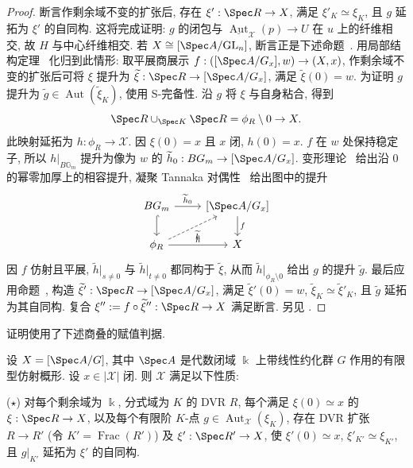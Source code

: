 \begin{proof}
断言作剩余域不变的扩张后, 存在 $\xi':\Spec R\to\mathcal X$, 满足 $\xi'_K\simeq\xi_K$, 且 $g$ 延拓为 $\xi'$ 的自同构. 这将完成证明: $g$ 的闭包与 $\underline{\operatorname{Aut}}_{\mathcal X}(p)\to U$ 在 $u$ 上的纤维相交, 故 $H$ 与中心纤维相交. 若 $\mathcal X\cong[\Spec A/\mathrm{GL}_n]$, 断言正是下述命题~. 用局部结构定理~ 化归到此情形: 取平展商展示 $f:([\Spec A/G_x],w)\to(\mathcal X,x)$, 作剩余域不变的扩张后可将 $\xi$ 提升为 $\widetilde\xi:\Spec R\to[\Spec A/G_x]$, 满足 $\widetilde\xi(0)=w$. 为证明 $g$ 提升为 $\widetilde g\in\operatorname{Aut}(\widetilde\xi_K)$, 使用 S-完备性. 沿 $g$ 将 $\xi$ 与自身粘合, 得到
\[\Spec R\cup_{\Spec K}\Spec R=\phi_R\setminus0\to\mathcal X.\]
此映射延拓为 $h:\phi_R\to\mathcal X$. 因 $\xi(0)=x$ 且 $x$ 闭, $h(0)=x$. $f$ 在 $w$ 处保持稳定子, 所以 $h|_{B\mathbb G_m}$ 提升为像为 $w$ 的 $\widetilde h_0:B\mathbb G_m\to[\Spec A/G_x]$. 变形理论~ 给出沿 $0$ 的幂零加厚上的相容提升, 凝聚 Tannaka 对偶性~ 给出图中的提升
\[\begin{tikzcd}[ampersand replacement=\&]B\mathbb G_m\arrow[r,"{\widetilde h_0}"]\arrow[d,hook]\&{[\Spec A/G_x]}\arrow[d,"{f}"]\\\phi_R\arrow[r,"{h}"]\arrow[ur,dashed,"{\widetilde h}"']\&\mathcal X\end{tikzcd}\]
因 $f$ 仿射且平展, $\widetilde h|_{s\ne0}$ 与 $\widetilde h|_{t\ne0}$ 都同构于 $\widetilde\xi$, 从而 $\widetilde h|_{\phi_R\setminus0}$ 给出 $g$ 的提升 $\widetilde g$. 最后应用命题~, 构造 $\widetilde\xi':\Spec R\to[\Spec A/G_x]$, 满足 $\widetilde\xi'(0)=w$, $\widetilde\xi_K\simeq\widetilde\xi'_K$, 且 $\widetilde g$ 延拓为其自同构. 复合 $\xi'':=f\circ\widetilde\xi'':\Spec R\to\mathcal X$ 满足断言. 另见 \cite[定理~5.2]{AHLH23}.
\end{proof}
证明使用了下述商叠的赋值判据.
\begin{proposition}\label{src:7.10.24}
设 $\mathcal X=[\Spec A/G]$, 其中 $\Spec A$ 是代数闭域 $\Bbbk$ 上带线性约化群 $G$ 作用的有限型仿射概形. 设 $x\in|\mathcal X|$ 闭. 则 $\mathcal X$ 满足以下性质:

($\star$) 对每个剩余域为 $\Bbbk$, 分式域为 $K$ 的 DVR $R$, 每个满足 $\xi(0)\simeq x$ 的 $\xi:\Spec R\to\mathcal X$, 以及每个有限阶 $K$-点 $g\in\operatorname{Aut}_{\mathcal X}(\xi_K)$, 存在 DVR 扩张 $R\to R'$ (令 $K'=\operatorname{Frac}(R')$) 及 $\xi':\Spec R'\to\mathcal X$, 使 $\xi'(0)\simeq x$, $\xi'_{K'}\simeq\xi_{K'}$, 且 $g|_{K'}$ 延拓为 $\xi'$ 的自同构.
\end{proposition}
